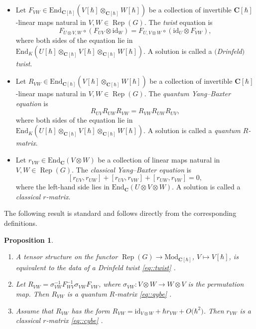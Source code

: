 \documentclass[10pt,a4paper]{amsart}
\numberwithin{equation}{section}
\newtheorem{Proposition}[Theorem]{Proposition}
{ \theoremstyle{definition}
	\newtheorem{Definition}[Theorem]{Definition}
	\newtheorem{Note}[Theorem]{Note}
	\newtheorem{Example}[Theorem]{Example}
	\newtheorem{Remark}[Theorem]{Remark} }
\newcommand{\C}{\mathbf{C}}
\newcommand{\Mod}[1]{{\mathrm{Mod}}_{#1}}
\newcommand{\End}{\mathrm{End}}
\newcommand{\id}{\mathrm{id}}
\DeclareMathOperator{\Rep}{Rep}
\begin{document}
	\begin{Definition}
		\label{def::all_constant}\qquad
		\begin{itemize}\itemsep=0pt
			\item Let $F_{VW} \in \End_{\C[\hbar]}(V[\hbar]\otimes_{\C[\hbar]} W[\hbar]) $ be a collection of invertible $\C[\hbar]$-linear maps natural in $V,W\in \Rep(G)$. The \emph{twist} equation is
			\begin{equation}
				\label{eq::twist}
				F_{U \otimes V,W} \circ (F_{UV} \otimes \id_W) = F_{U,V\otimes W} \circ (\id_U \otimes F_{VW}),
			\end{equation}
			where both sides of the equation lie in $\End_K(U[\hbar] \otimes_{\C[\hbar]} V[\hbar] \otimes_{\C[\hbar]} W[\hbar])$. A solution is called a \emph{$($Drinfeld$)$ twist}.
			\item Let $R_{VW}\in \End_{\C[\hbar]}(V[\hbar]\otimes_{\C[\hbar]} W[\hbar]) $ be a collection of invertible $\C[\hbar]$-linear maps natural in $V,W\in \Rep(G)$. The \emph{quantum Yang--Baxter equation} is
			\begin{equation}
				\label{eq::qybe}
				R_{UV} R_{UW} R_{VW} = R_{VW} R_{UW} R_{UV},
			\end{equation}
			where both sides of the equation lie in $\End_K(U[\hbar] \otimes_{\C[\hbar]} V[\hbar] \otimes_{\C[\hbar]} W[\hbar])$. A solution is called a \emph{quantum $R$-matrix}.
			\item Let $r_{VW}\in \End_{\C}(V\otimes W) $ be a collection of linear maps natural in $V,W\in \Rep(G)$. The \emph{classical Yang--Baxter equation} is
			\begin{equation}
				\label{eq::cybe}
				[r_{UV},r_{UW}] + [r_{UV},r_{VW}] + [r_{UW}, r_{VW}] = 0,
			\end{equation}
			where the left-hand side lies in $\End_{\C}(U \otimes V \otimes W)$. A solution is called a \emph{classical $r$-matrix}.
		\end{itemize}
	\end{Definition}
	
	The following result is standard and follows directly from the corresponding definitions.
	\begin{Proposition}\qquad
		\begin{enumerate}\itemsep=0pt
			\item[$(1)$] A tensor structure on the functor
$
			\Rep(G) \rightarrow \Mod{\C[\hbar]}$, $ V \mapsto V[\hbar]$,
			is equivalent to the data of a Drinfeld twist \eqref{eq::twist} {\rm\cite[\emph{Definition} 2.4.1]{EGNO}}.
			\item[$(2)$] Let $R_{VW} = \sigma_{VW}^{-1} F_{WV}^{-1} \sigma_{VW} F_{VW}$, where $\sigma_{VW} \colon V \otimes W \rightarrow W \otimes V$ is the permutation map. Then $R_{VW}$ is a quantum $R$-matrix \eqref{eq::qybe} {\rm\cite[\emph{Definition} 8.1.1]{EGNO}}.
			\item[$(3)$] Assume that $R_{VW}$ has the form $R_{VW} = \id_{V \otimes W} + \hbar r_{VW} + O\bigl(\hbar^2\bigr)$. Then $r_{VW}$ is a classical $r$-matrix \eqref{eq::cybe} {\rm\cite[\emph{Proposition} 9.4]{EtingofSchiffmannQuantumGroups}}.
		\end{enumerate}
	\end{Proposition}
	
\end{document}
